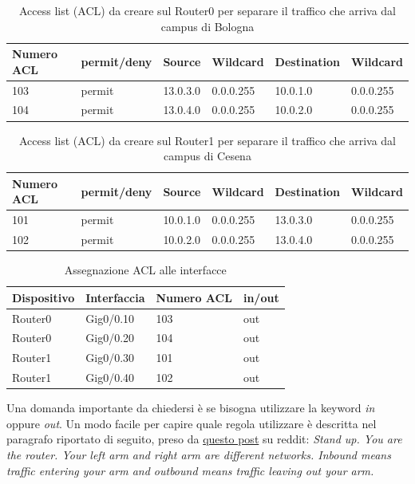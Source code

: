 \documentclass[a4paper,12pt]{report}
\begin{document}
\begin{table}[H]
\begin{tabular}{@{}llllll@{}}
\toprule
Numero ACL & permit/deny & Source & Wildcard & Destination & Wildcard \\ \midrule
103 & permit & 13.0.3.0 & 0.0.0.255 & 10.0.1.0 & 0.0.0.255 \\
104 & permit & 13.0.4.0 & 0.0.0.255 & 10.0.2.0 & 0.0.0.255 \\ \bottomrule
\end{tabular}
\caption{Access list (ACL) da creare sul Router0 per separare il traffico che arriva dal campus di Bologna}
\label{table:access_list_router1}
\end{table}
\begin{table}[H]
\begin{tabular}{@{}llllll@{}}
\toprule
Numero ACL & permit/deny & Source & Wildcard & Destination & Wildcard \\ \midrule
101 & permit & 10.0.1.0 & 0.0.0.255 & 13.0.3.0 & 0.0.0.255 \\
102 & permit & 10.0.2.0 & 0.0.0.255 & 13.0.4.0 & 0.0.0.255 \\ \bottomrule
\end{tabular}
\caption{Access list (ACL) da creare sul Router1 per separare il traffico che arriva dal campus di Cesena}
\label{table:access_list_router0}
\end{table}
\begin{table}[H]
\begin{tabular}{@{}llll@{}}
\toprule
Dispositivo & Interfaccia & Numero ACL & in/out \\ \midrule
Router0 & Gig0/0.10 & 103 & out \\
Router0 & Gig0/0.20 & 104 & out \\
Router1 & Gig0/0.30 & 101 & out \\
Router1 & Gig0/0.40 & 102 & out \\ \bottomrule
\end{tabular}
\caption{Assegnazione ACL alle interfacce}
\label{table:access_group}
\end{table}
Una domanda importante da chiedersi è se bisogna utilizzare la keyword \textit{in} oppure \textit{out}.
%
Un modo facile per capire quale regola utilizzare è descritta nel paragrafo riportato di seguito, preso da \href{https://www.reddit.com/r/ccna/comments/5x39ow/confused_on_the_difference_between_inout_standard/deexypo/}{questo post} su reddit: \textit{Stand up. You are the router. Your left arm and right arm are different networks. Inbound means traffic entering your arm and outbound means traffic leaving out your arm.}
\end{document}
